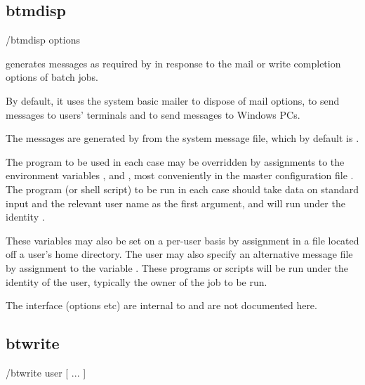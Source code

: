 \subsection{btmdisp}

\begin{expara}

\progsdirname/btmdisp options

\end{expara}

 generates messages as required by  in response to the mail or write
completion options of batch jobs.

By default, it uses the system basic mailer to dispose of mail options,  to send messages
to users' terminals and  to send messages to Windows PCs.

The messages are generated by  from the system message file, which by default is
.

The program to be used in each case may be overridden by assignments to the environment variables ,
 and , most conveniently in the master configuration file
\masterconfig. The program (or shell script) to be run in each case should take data on standard input and the
relevant user name as the first argument, and will run under the identity \batchuser{}.

These variables may also be set on a per-user basis by assignment in a \homeconfigpath{} file located off a user's
home directory. The user may also specify an alternative message file by assignment to the variable . These
programs or scripts will be run under the identity of the user, typically the owner of the job to be run.

The interface (options etc) are internal to \ProductName{} and are not documented here.

\subsection{btwrite}

\begin{expara}

\progsdirname/btwrite user [ ... ]

\end{expara}

